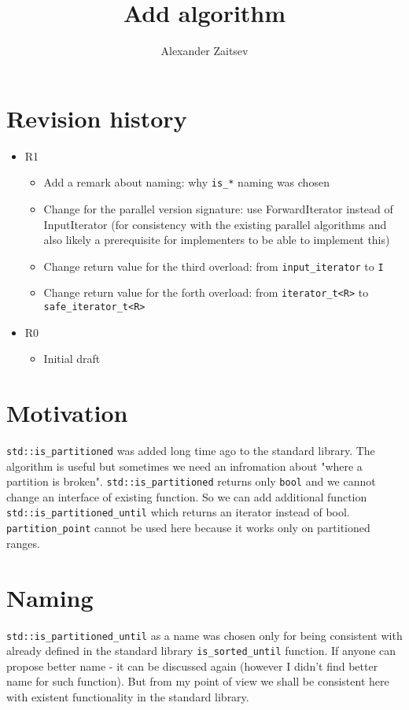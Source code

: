 \documentclass{wg21}
\title{Add \cc{std::is_partitioned_until} algorithm}
\author{Alexander Zaitsev}{zamazan4ik@tut.by, zamazan4ik@gmail.com}
\newcommand{\cc}[1]{\texttt{#1}}
\begin{document}
\maketitle

\section{Revision history}
\begin{itemize}
  \item R1
  \begin{itemize}
  	\item Add a remark about naming: why \cc{is_*} naming was chosen
  	\item Change for the parallel version signature: use ForwardIterator instead of InputIterator (for consistency with the existing parallel algorithms and also likely a prerequisite for implementers to be able to implement this)
  	\item Change return value for the third overload: from \cc{input_iterator} to \cc{I}
  	\item Change return value for the forth overload: from \cc{iterator_t<R>} to \cc{safe_iterator_t<R>}
  \end{itemize}
  \item R0
  \begin{itemize}
  	\item Initial draft
  \end{itemize}
\end{itemize}

\section{Motivation}
\cc{std::is_partitioned} was added long time ago to the standard library. The algorithm is useful but sometimes we need an infromation about "where a partition is broken". \cc{std::is_partitioned} returns only \cc{bool} and we cannot change an interface of existing function. So we can add additional function \cc{std::is_partitioned_until} which returns an iterator instead of bool. \cc{partition_point} cannot be used here because it works only on partitioned ranges.

\section{Naming}
\cc{std::is_partitioned_until} as a name was chosen only for being consistent with already defined in the standard library \cc{is_sorted_until} function. If anyone can propose better name - it can be discussed again (however I didn't find better name for such function). But from my point of view we shall be consistent here with existent functionality in the standard library.
\end{document}
